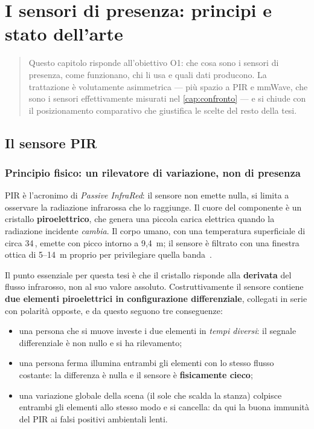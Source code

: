 \chapter{I sensori di presenza: principi e stato dell'arte}
\label{cap:sensori}

\begin{quote}\small
Questo capitolo risponde all'obiettivo O1: che cosa sono i sensori di presenza,
come funzionano, chi li usa e quali dati producono. La trattazione è
volutamente asimmetrica --- più spazio a PIR e mmWave, che sono i sensori
effettivamente misurati nel \cref{cap:confronto} --- e si chiude con il
posizionamento comparativo che giustifica le scelte del resto della tesi.
\end{quote}

\section{Il sensore PIR}
\label{sec:pir}

\subsection{Principio fisico: un rilevatore di variazione, non di presenza}
\label{sec:pir-principio}

PIR è l'acronimo di \emph{Passive InfraRed}: il sensore non emette nulla, si limita
a osservare la radiazione infrarossa che lo raggiunge. Il cuore del componente è un
cristallo \textbf{piroelettrico}, che genera una piccola carica elettrica quando la
radiazione incidente \emph{cambia}. Il corpo umano, con una temperatura superficiale
di circa 34\,\celsius, emette con picco intorno a 9,4~\textmu m; il sensore è
filtrato con una finestra ottica di 5--14~\textmu m proprio per privilegiare quella
banda~\cite{adafruitPIR}.

Il punto essenziale per questa tesi è che il cristallo risponde alla
\textbf{derivata} del flusso infrarosso, non al suo valore assoluto.
Costruttivamente il sensore contiene \textbf{due elementi piroelettrici in
configurazione differenziale}, collegati in serie con polarità opposte, e da questo
seguono tre conseguenze:

\begin{itemize}[leftmargin=1.4em,itemsep=2pt]
  \item una persona che si muove investe i due elementi in \emph{tempi diversi}: il
        segnale differenziale è non nullo e si ha rilevamento;
  \item una persona ferma illumina entrambi gli elementi con lo stesso flusso
        costante: la differenza è nulla e il sensore è \textbf{fisicamente cieco};
  \item una variazione globale della scena (il sole che scalda la stanza) colpisce
        entrambi gli elementi allo stesso modo e si cancella: da qui la buona
        immunità del PIR ai falsi positivi ambientali lenti.
\end{itemize}

